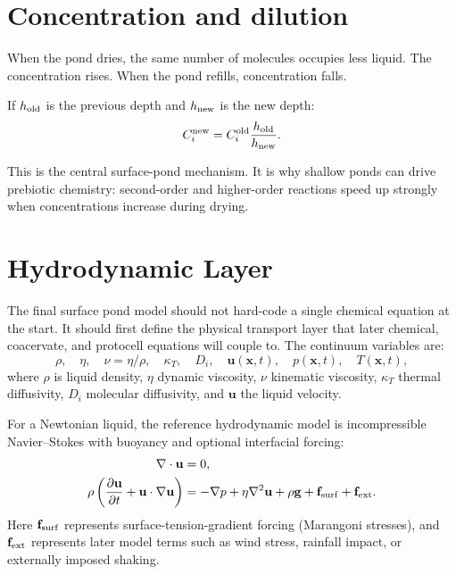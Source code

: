 \documentclass[11pt]{article}
\begin{document}
\section{Concentration and dilution}

When the pond dries, the same number of molecules occupies less liquid. The
concentration rises. When the pond refills, concentration falls.

If $h_{\rm old}$ is the previous depth and $h_{\rm new}$ is the new depth:
\begin{equation}
C_i^{\rm new}
=
C_i^{\rm old}
\frac{h_{\rm old}}{h_{\rm new}}.
\end{equation}

This is the central surface-pond mechanism. It is why shallow ponds can drive
prebiotic chemistry: second-order and higher-order reactions speed up strongly
when concentrations increase during drying.

\section{Hydrodynamic Layer}

The final surface pond model should not hard-code a single chemical equation at
the start. It should first define the physical transport layer that later
chemical, coacervate, and protocell equations will couple to. The continuum
variables are:
\begin{equation}
\rho,\quad
\eta,\quad
\nu=\eta/\rho,\quad
\kappa_T,\quad
D_i,\quad
\mathbf{u}(\mathbf{x},t),\quad
p(\mathbf{x},t),\quad
T(\mathbf{x},t),
\end{equation}
where $\rho$ is liquid density, $\eta$ dynamic viscosity, $\nu$ kinematic
viscosity, $\kappa_T$ thermal diffusivity, $D_i$ molecular diffusivity, and
$\mathbf{u}$ the liquid velocity.

For a Newtonian liquid, the reference hydrodynamic model is incompressible
Navier--Stokes with buoyancy and optional interfacial forcing:
\begin{align}
\nabla\cdot \mathbf{u} &= 0,\\
\rho\left(
\frac{\partial \mathbf{u}}{\partial t}
+\mathbf{u}\cdot\nabla\mathbf{u}
\right)
&=
-\nabla p
+\eta\nabla^2\mathbf{u}
+\rho \mathbf{g}
+\mathbf{f}_{\rm surf}
+\mathbf{f}_{\rm ext}.
\end{align}
Here $\mathbf{f}_{\rm surf}$ represents surface-tension-gradient forcing
(Marangoni stresses), and $\mathbf{f}_{\rm ext}$ represents later model terms
such as wind stress, rainfall impact, or externally imposed shaking.
\end{document}
